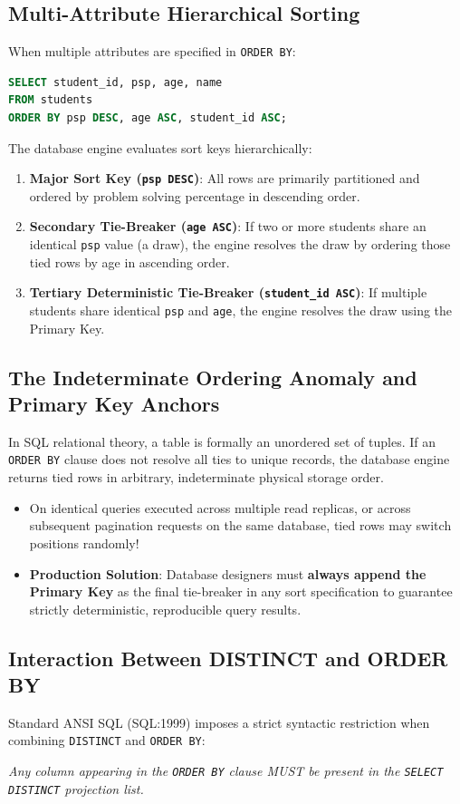 \documentclass[10pt,journal,compsoc,onecolumn]{IEEEtran}
\begin{document}
\subsection{Multi-Attribute Hierarchical Sorting}
When multiple attributes are specified in \texttt{ORDER BY}:
\begin{lstlisting}[language=SQL]
SELECT student_id, psp, age, name 
FROM students 
ORDER BY psp DESC, age ASC, student_id ASC;
\end{lstlisting}
The database engine evaluates sort keys hierarchically:
\begin{enumerate}
    \item \textbf{Major Sort Key (\texttt{psp DESC})}: All rows are primarily partitioned and ordered by problem solving percentage in descending order.
    \item \textbf{Secondary Tie-Breaker (\texttt{age ASC})}: If two or more students share an identical \texttt{psp} value (a draw), the engine resolves the draw by ordering those tied rows by age in ascending order.
    \item \textbf{Tertiary Deterministic Tie-Breaker (\texttt{student\_id ASC})}: If multiple students share identical \texttt{psp} and \texttt{age}, the engine resolves the draw using the Primary Key.
\end{enumerate}

\subsection{The Indeterminate Ordering Anomaly and Primary Key Anchors}
In SQL relational theory, a table is formally an unordered set of tuples. If an \texttt{ORDER BY} clause does not resolve all ties to unique records, the database engine returns tied rows in arbitrary, indeterminate physical storage order.
\begin{itemize}
    \item On identical queries executed across multiple read replicas, or across subsequent pagination requests on the same database, tied rows may switch positions randomly!
    \item \textbf{Production Solution}: Database designers must \textbf{always append the Primary Key} as the final tie-breaker in any sort specification to guarantee strictly deterministic, reproducible query results.
\end{itemize}

\subsection{Interaction Between DISTINCT and ORDER BY}
Standard ANSI SQL (SQL:1999) imposes a strict syntactic restriction when combining \texttt{DISTINCT} and \texttt{ORDER BY}:
\begin{center}
\textit{Any column appearing in the \texttt{ORDER BY} clause MUST be present in the \texttt{SELECT DISTINCT} projection list.}
\end{center}
\end{document}
